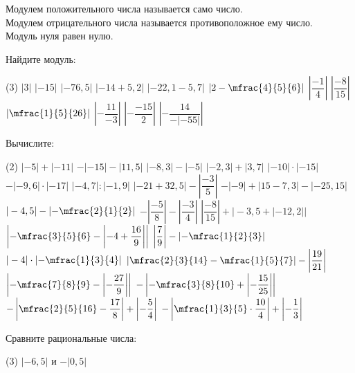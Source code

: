 \begin{class}[number=5-6]
	\begin{definit}
		Модулем положительного числа называется само число. \\
		Модулем отрицательного числа называется противоположное ему число. \\
		Модуль нуля равен нулю.
	\end{definit}
	\begin{listofex}
		\item Найдите модуль:
		\begin{tasks}(3)
			\task \(  |3| \)
			\task \(  |-15| \)
			\task \( |-76,5|  \)
			\task \( |-14+5,2|  \)
			\task \( |-22,1-5,7|  \)
			\task \(  \left|2-\mfrac{4}{5}{6}\right| \)
			\task \(  \left|\dfrac{-1}{4}\right| \)
			\task \(  \left|\dfrac{-8}{15}\right| \)
			\task \(  \left|\mfrac{1}{5}{26}\right| \)
			\task \(  \left|-\dfrac{11}{-3}\right| \)
			\task \(  \left|-\dfrac{-15}{2}\right| \)
			\task \(  \left|-\dfrac{14}{-|-55|}\right| \)
		\end{tasks}
		\item Вычислите:
		\begin{tasks}(2)
			\task \(  |-5|+|-11| \)
			\task \(  -|-15|-|11,5| \)
			\task \( |-8,3|-|-5| \)
			\task \( |-2,3|+|3,7|  \)
			\task \(  |-10|\cdot|-15| \)
			\task \(  -|-9,6|\cdot|-17| \)
			\task \( |-4,7|:|-1,9| \)
			\task \( |-21+32,5| - \left|\dfrac{-3}{5}\right|  \)
			\task \( -|-9|+|15-7,3|-|-25,15|  \)
			\task \(  |-4,5|-\left|-\mfrac{2}{1}{2}\right| \)
			\task \(  -\left| \dfrac{-5}{8} \right|-\left|\dfrac{-3}{4}\right| \)
			\task \(  \left|\dfrac{-8}{15}\right| + \bigl|-3,5+|-12,2|| \)
			\task \(  \left|-\mfrac{3}{5}{6} - \left|-4+\dfrac{16}{9}\right|\right| \)
			\task \( \left|\dfrac{7}{9}\right|-\left|-\mfrac{1}{2}{3}\right| \)
			\task \( |-4|\cdot\left|-\mfrac{1}{3}{4}\right| \)
			\task \( \left|\mfrac{2}{3}{14}-\mfrac{1}{5}{7}\right|-\left|\dfrac{19}{21}\right| \)
			\task \(  \left|-\mfrac{7}{8}{9} - \left|-\dfrac{27}{9}\right|\right| \)
			\task \( -\left|-\mfrac{3}{8}{10} + \left|-\dfrac{15}{25}\right|\right| \)
			\task \( -\left|\mfrac{2}{5}{16}-\dfrac{17}{8}\right|+\left|-\dfrac{5}{4}\right| \)
			\task \( -\left|\mfrac{1}{3}{5} \cdot \dfrac{10}{4}\right|+\left|-\dfrac{1}{3}\right| \)
		\end{tasks}
		\newpage
		\item Сравните рациональные числа:
		\begin{tasks}(3)
			\task \( |-6,5| \) и \( -|0,5| \)

\end{tasks}
\end{listofex}
\end{class}
